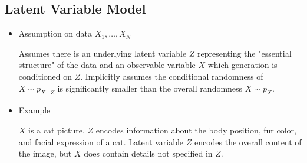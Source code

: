 \subsection{Latent Variable Model}


\begin{frame}[allowframebreaks]

\begin{itemize}
    \item
    Assumption on data $X_{1}, \ldots, X_{N}$

    Assumes there is an underlying latent variable $Z$ representing the "essential structure" of the data and an observable variable $X$ which generation is conditioned on $Z$. Implicitly assumes the conditional randomness of $X \sim p_{X \mid Z}$ is significantly smaller than the overall randomness $X \sim p_{X}$.
    \item
    Example

    $X$ is a cat picture. $Z$ encodes information about the body position, fur color, and facial expression of a cat. Latent variable $Z$ encodes the overall content of the image, but $X$ does contain details not specified in $Z$.
\end{itemize}

\end{frame}

